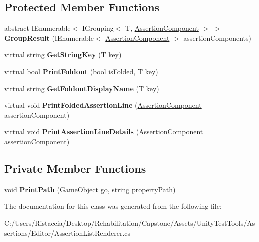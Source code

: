 \subsection*{Protected Member Functions}
\begin{DoxyCompactItemize}
\item 
\mbox{\label{class_unity_test_1_1_assertion_list_renderer_ad3302b401c952ca49ea5c5834f9619c9}} 
abstract I\+Enumerable$<$ I\+Grouping$<$ T, \hyperlink{class_unity_test_1_1_assertion_component}{Assertion\+Component} $>$ $>$ {\bfseries Group\+Result} (I\+Enumerable$<$ \hyperlink{class_unity_test_1_1_assertion_component}{Assertion\+Component} $>$ assertion\+Components)
\item 
\mbox{\label{class_unity_test_1_1_assertion_list_renderer_a7b2fa231020067db4e919b7624acb109}} 
virtual string {\bfseries Get\+String\+Key} (T key)
\item 
\mbox{\label{class_unity_test_1_1_assertion_list_renderer_a56aa7fbf9d2e94cacc654da7d011ca0d}} 
virtual bool {\bfseries Print\+Foldout} (bool is\+Folded, T key)
\item 
\mbox{\label{class_unity_test_1_1_assertion_list_renderer_a76adf7cd38df75b4f1d272d15edce865}} 
virtual string {\bfseries Get\+Foldout\+Display\+Name} (T key)
\item 
\mbox{\label{class_unity_test_1_1_assertion_list_renderer_a9e23bdcf51bac6d50077977343b1c13e}} 
virtual void {\bfseries Print\+Folded\+Assertion\+Line} (\hyperlink{class_unity_test_1_1_assertion_component}{Assertion\+Component} assertion\+Component)
\item 
\mbox{\label{class_unity_test_1_1_assertion_list_renderer_a33504a1248f60a755fcda5457c35f02c}} 
virtual void {\bfseries Print\+Assertion\+Line\+Details} (\hyperlink{class_unity_test_1_1_assertion_component}{Assertion\+Component} assertion\+Component)
\end{DoxyCompactItemize}
\subsection*{Private Member Functions}
\begin{DoxyCompactItemize}
\item 
\mbox{\label{class_unity_test_1_1_assertion_list_renderer_a4eae6df9aaf183654c1247baf3aea07a}} 
void {\bfseries Print\+Path} (Game\+Object go, string property\+Path)
\end{DoxyCompactItemize}


The documentation for this class was generated from the following file\+:\begin{DoxyCompactItemize}
\item 
C\+:/\+Users/\+Ristaccia/\+Desktop/\+Rehabilitation/\+Capstone/\+Assets/\+Unity\+Test\+Tools/\+Assertions/\+Editor/Assertion\+List\+Renderer.\+cs\end{DoxyCompactItemize}
